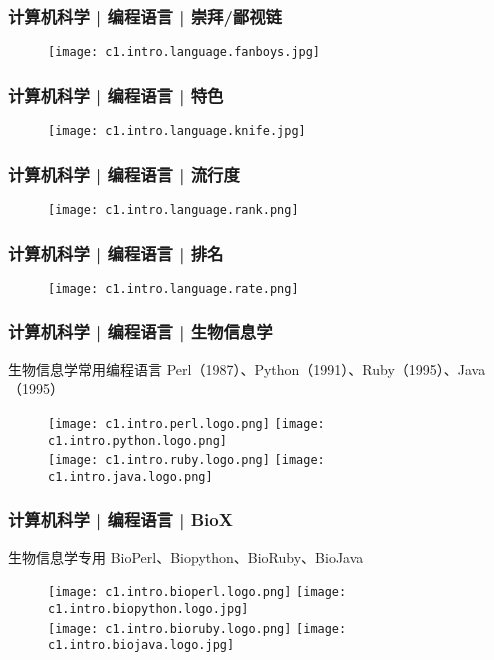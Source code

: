 \begin{frame}
  \frametitle{计算机科学 | 编程语言 | 崇拜/鄙视链}
  \begin{figure}
    \centering
    \texttt{[image: c1.intro.language.fanboys.jpg]}
  \end{figure}
\end{frame}

\begin{frame}
  \frametitle{计算机科学 | 编程语言 | 特色}
  \begin{figure}
    \centering
    \texttt{[image: c1.intro.language.knife.jpg]}
  \end{figure}
\end{frame}

\begin{frame}
  \frametitle{计算机科学 | 编程语言 | 流行度}
  \begin{figure}
    \centering
    \texttt{[image: c1.intro.language.rank.png]}
  \end{figure}
\end{frame}

\begin{frame}
  \frametitle{计算机科学 | 编程语言 | 排名}
  \begin{figure}
    \centering
    \texttt{[image: c1.intro.language.rate.png]}
  \end{figure}
\end{frame}

\begin{frame}
  \frametitle{计算机科学 | 编程语言 | 生物信息学}
  \begin{block}{\alert{生物信息学常用编程语言}}
    Perl（1987）、Python（1991）、Ruby（1995）、Java（1995）
  \end{block}
  \begin{figure}
    \centering
    \texttt{[image: c1.intro.perl.logo.png]}
    \hspace{2em}
    \texttt{[image: c1.intro.python.logo.png]}\\
    \texttt{[image: c1.intro.ruby.logo.png]}
    \hspace{11em}
    \texttt{[image: c1.intro.java.logo.png]}
  \end{figure}
\end{frame}

\begin{frame}
  \frametitle{计算机科学 | 编程语言 | BioX}
  \begin{block}{\alert{生物信息学专用}}
    BioPerl、Biopython、BioRuby、BioJava
  \end{block}
  \begin{figure}
    \centering
    \texttt{[image: c1.intro.bioperl.logo.png]}
    \hspace{2em}
    \texttt{[image: c1.intro.biopython.logo.jpg]}\\
    \texttt{[image: c1.intro.bioruby.logo.png]}
    \hspace{10em}
    \texttt{[image: c1.intro.biojava.logo.jpg]}
  \end{figure}
\end{frame}

